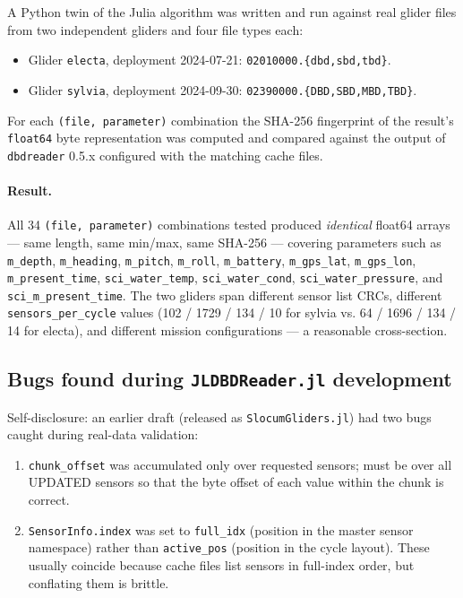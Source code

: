 \documentclass[11pt]{article}
\begin{document}
A Python twin of the Julia algorithm was written and run against real
glider files from two independent gliders and four file types each:

\begin{itemize}[leftmargin=*,topsep=1pt,itemsep=0pt]
  \item Glider \texttt{electa}, deployment 2024-07-21:
        \texttt{02010000.\{dbd,sbd,tbd\}}.
  \item Glider \texttt{sylvia}, deployment 2024-09-30:
        \texttt{02390000.\{DBD,SBD,MBD,TBD\}}.
\end{itemize}

For each \texttt{(file, parameter)} combination the SHA-256 fingerprint of
the result's \texttt{float64} byte representation was computed and compared
against the output of \texttt{dbdreader} 0.5.x configured with the matching
cache files.

\paragraph{Result.}
All 34 \texttt{(file, parameter)} combinations tested produced
\emph{identical} float64 arrays — same length, same min/max, same SHA-256
— covering parameters such as \texttt{m\_depth}, \texttt{m\_heading},
\texttt{m\_pitch}, \texttt{m\_roll}, \texttt{m\_battery},
\texttt{m\_gps\_lat}, \texttt{m\_gps\_lon}, \texttt{m\_present\_time},
\texttt{sci\_water\_temp}, \texttt{sci\_water\_cond},
\texttt{sci\_water\_pressure}, and \texttt{sci\_m\_present\_time}.  The
two gliders span different sensor list CRCs, different
\texttt{sensors\_per\_cycle} values (102 / 1729 / 134 / 10 for sylvia vs.
64 / 1696 / 134 / 14 for electa), and different mission configurations
— a reasonable cross-section.

\subsection{Bugs found during \texttt{JLDBDReader.jl} development}

Self-disclosure: an earlier draft (released as \texttt{SlocumGliders.jl})
had two bugs caught during real-data validation:

\begin{enumerate}[leftmargin=*,topsep=1pt,itemsep=0pt]
  \item \texttt{chunk\_offset} was accumulated only over requested sensors;
    must be over all UPDATED sensors so that the byte offset of each value
    within the chunk is correct.
  \item \texttt{SensorInfo.index} was set to \texttt{full\_idx} (position in
    the master sensor namespace) rather than \texttt{active\_pos} (position
    in the cycle layout).  These usually coincide because cache files list
    sensors in full-index order, but conflating them is brittle.
\end{enumerate}
\end{document}
